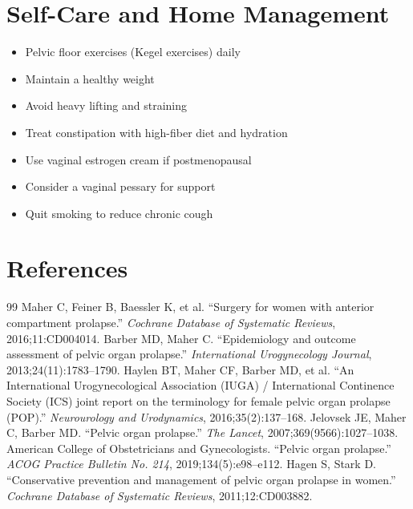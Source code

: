 \section*{Self-Care and Home Management}
\begin{itemize}
\item Pelvic floor exercises (Kegel exercises) daily
\item Maintain a healthy weight
\item Avoid heavy lifting and straining
\item Treat constipation with high-fiber diet and hydration
\item Use vaginal estrogen cream if postmenopausal
\item Consider a vaginal pessary for support
\item Quit smoking to reduce chronic cough
\end{itemize}

\section*{References}
\begin{thebibliography}{99}
 Maher C, Feiner B, Baessler K, et al. ``Surgery for women with anterior compartment prolapse.'' \textit{Cochrane Database of Systematic Reviews}, 2016;11:CD004014.
 Barber MD, Maher C. ``Epidemiology and outcome assessment of pelvic organ prolapse.'' \textit{International Urogynecology Journal}, 2013;24(11):1783--1790.
 Haylen BT, Maher CF, Barber MD, et al. ``An International Urogynecological Association (IUGA) / International Continence Society (ICS) joint report on the terminology for female pelvic organ prolapse (POP).'' \textit{Neurourology and Urodynamics}, 2016;35(2):137--168.
 Jelovsek JE, Maher C, Barber MD. ``Pelvic organ prolapse.'' \textit{The Lancet}, 2007;369(9566):1027--1038.
 American College of Obstetricians and Gynecologists. ``Pelvic organ prolapse.'' \textit{ACOG Practice Bulletin No. 214}, 2019;134(5):e98--e112.
 Hagen S, Stark D. ``Conservative prevention and management of pelvic organ prolapse in women.'' \textit{Cochrane Database of Systematic Reviews}, 2011;12:CD003882.
\end{thebibliography}
